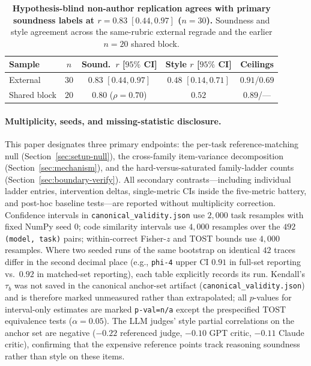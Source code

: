 \begin{table}[t]
\centering
\caption{\textbf{Hypothesis-blind non-author replication agrees with primary soundness labels at $r = 0.83 \; [0.44, 0.97]$ ($n{=}30$).} Soundness and style agreement across the same-rubric external regrade and the earlier $n{=}20$ shared block.}
\label{tab:reliability}
\scriptsize
\setlength{\tabcolsep}{2.2pt}
\begin{tabular}{@{}lcccc@{}}
\toprule
Sample & $n$ & Sound.\ $r$ [$95\%$ CI] & Style $r$ [$95\%$ CI] & Ceilings \\
\midrule
External & $30$ & $0.83$ $[0.44, 0.97]$ & $0.48$ $[0.14, 0.71]$ & $0.91$/$0.69$ \\
Shared block & $20$ & $0.80$ ($\rho{=}0.70$) & $0.52$ & $0.89$/--- \\
\bottomrule
\end{tabular}
\end{table}

\paragraph{Multiplicity, seeds, and missing-statistic disclosure.}
This paper designates three primary endpoints: the per-task reference-matching null (Section~\ref{sec:setup-null}), the cross-family item-variance decomposition (Section~\ref{sec:mechanism}), and the hard-versus-saturated family-ladder counts (Section~\ref{sec:boundary-verify}).
All secondary contrasts---including individual ladder entries, intervention deltas, single-metric CIs inside the five-metric battery, and post-hoc baseline tests---are reported without multiplicity correction.
Confidence intervals in \texttt{canonical\_validity.json} use $2{,}000$ task resamples with fixed NumPy seed $0$; code similarity intervals use $4{,}000$ resamples over the $492$ \texttt{(model, task)} pairs; within-correct Fisher-$z$ and TOST bounds use $4{,}000$ resamples.
Where two seeded runs of the same bootstrap on identical $42$ traces differ in the second decimal place (e.g., \texttt{phi-4} upper CI $0.91$ in full-set reporting vs.\ $0.92$ in matched-set reporting), each table explicitly records its run.
Kendall's $\tau_b$ was not saved in the canonical anchor-set artifact (\texttt{canonical\_validity.json}) and is therefore marked unmeasured rather than extrapolated; all $p$-values for interval-only estimates are marked \texttt{p-val=n/a} except the prespecified TOST equivalence tests ($\alpha = 0.05$).
The LLM judges' style partial correlations on the anchor set are negative ($-0.22$ referenced judge, $-0.10$ GPT critic, $-0.11$ Claude critic), confirming that the expensive reference points track reasoning soundness rather than style on these items.
